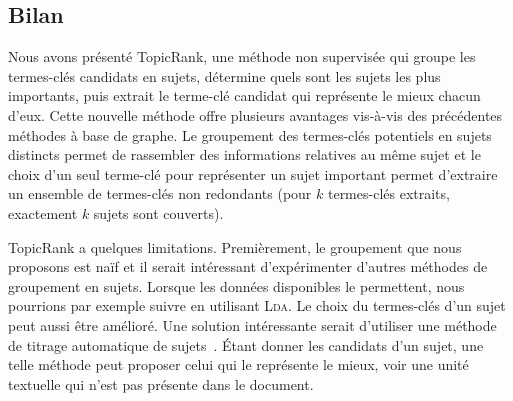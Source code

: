       \subsection{Bilan}
      \label{subsec:main:domain_independent_keyphrase_extraction-unsupervised_automatic_keyphrase_extraction-bilan}
        Nous avons présenté TopicRank, une méthode non supervisée qui groupe les
        termes-clés candidats en sujets, détermine quels sont les sujets les
        plus importants, puis extrait le terme-clé candidat qui représente le
        mieux chacun d'eux. Cette nouvelle méthode
        offre plusieurs avantages vis-à-vis des précédentes méthodes à base de
        graphe. Le groupement des termes-clés potentiels en sujets distincts
        permet de rassembler des informations relatives au même sujet et le
        choix d'un seul terme-clé pour représenter un sujet important permet
        d'extraire un ensemble de termes-clés non redondants (pour $k$
        termes-clés extraits, exactement $k$ sujets sont couverts).

        TopicRank a quelques limitations. Premièrement, le groupement que nous
        proposons est \og{}naïf\fg{} et il serait intéressant d'expérimenter
        d'autres méthodes de groupement en sujets. Lorsque les données
        disponibles le permettent, nous pourrions par exemple suivre
         en
        utilisant \textsc{Lda}. Le choix du termes-clés d'un sujet peut aussi
        être amélioré. Une solution intéressante serait d'utiliser une méthode
        de titrage automatique de sujets~\cite{lau2011topiclabeling}. Étant
        donner les candidats d'un sujet, une telle méthode peut proposer celui
        qui le représente le mieux, voir une unité textuelle qui n'est pas
        présente dans le document.

